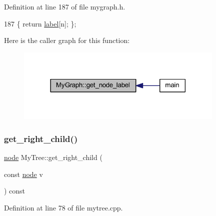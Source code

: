 Definition at line 187 of file mygraph.\+h.


\begin{DoxyCode}
187 \{ \textcolor{keywordflow}{return} \mbox{\hyperlink{class_my_graph_a5c9923e2b43cb5a3139715acc34b8ca8}{label}}[n]; \};
\end{DoxyCode}
Here is the caller graph for this function\+:
\nopagebreak
\begin{figure}[H]
\begin{center}
\leavevmode
\includegraphics[width=282pt]{class_my_graph_ab92ebd7632157e681a6a7d7873841de7_icgraph}
\end{center}
\end{figure}
\mbox{\label{class_my_tree_a5daf167d4bab0c1b0ca9b25cd3c45065}} 
\subsubsection{\texorpdfstring{get\+\_\+right\+\_\+child()}{get\_right\_child()}}
{\footnotesize\ttfamily \mbox{\hyperlink{classnode}{node}} My\+Tree\+::get\+\_\+right\+\_\+child (\begin{DoxyParamCaption}\item[{const \mbox{\hyperlink{classnode}{node}}}]{v }\end{DoxyParamCaption}) const}



Definition at line 78 of file mytree.\+cpp.


